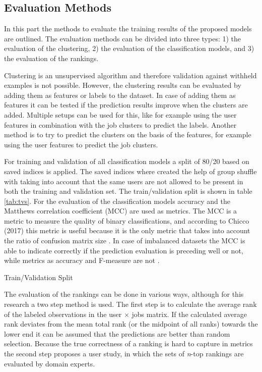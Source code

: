 \subsection{Evaluation Methods}
\label{ssec:eval}
In this part the methods to evaluate the training results of the proposed models are outlined.
The evaluation methods can be divided into three types: 1) the evaluation of the clustering, 2) the evaluation of the classification models, and 3) the evaluation of the rankings.

Clustering is an unsupervised algorithm and therefore validation against withheld examples is not possible.
However, the clustering results can be evaluated by adding them as features or labels to the dataset.
In case of adding them as features it can be tested if the prediction results improve when the clusters are added.
Multiple setups can be used for this, like for example using the user features in combination with the job clusters to predict the labels.
Another method is to try to predict the clusters on the basis of the features, for example using the user features to predict the job clusters. 

For training and validation of all classification models a split of 80/20 based on saved indices is applied. 
The saved indices where created the help of group shuffle with taking into account that the same users are not allowed to be present in both the training and validation set.
The train/validation split is shown in table \ref{tab:tvs}.
For the evaluation of the classification models accuracy and the Matthews correlation coefficient (MCC) \cite{matthews1975comparison} are used as metrics.
The MCC is a metric to measure the quality of binary classifications, and according to Chicco (2017) this metric is useful because it is the only metric that takes into account the ratio of confusion matrix size \cite{chicco2017ten}.
In case of imbalanced datasets the MCC is able to indicate correctly if the prediction evaluation is preceding well or not, while metrics as accuracy and F-measure are not \cite{boughorbel2017optimal}.

\begin{table}[h]
\begin{footnotesize}

\end{footnotesize}
\caption{\label{tab:tvs} \footnotesize{Train/Validation Split}}
\end{table}

The evaluation of the rankings can be done in various ways, although for this research a two step method is used. 
The first step is to calculate the average rank of the labeled observations in the user $\times$ jobs matrix.
If the calculated average rank deviates from the mean total rank (or the midpoint of all ranks) towards the lower end it can be assumed that the predictions are better than random selection. 
Because the true correctness of a ranking is hard to capture in metrics the second step proposes a user study, in which the sets of \textit{n}-top rankings are evaluated by domain experts. 